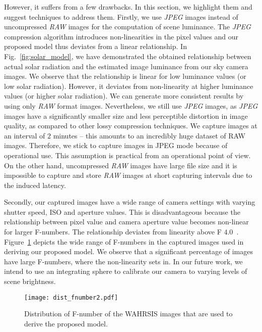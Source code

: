 However, it suffers from a few drawbacks. In this section, we highlight them and suggest techniques to address them. Firstly, we use \emph{JPEG} images instead of uncompressed \emph{RAW} images for the computation of scene luminance. The \emph{JPEG} compression algorithm introduces non-linearities in the pixel values and our proposed model thus deviates from a linear relationship. In Fig.~\ref{fig:solar_model}, we have demonstrated the obtained relationship between actual solar radiation and the estimated image luminance from our sky camera images. We observe that the relationship is linear for low luminance values (or low solar radiation). However, it deviates from non-linearity at higher luminance values (or higher solar radiation). We can generate more consistent results by using only \emph{RAW} format images. Nevertheless, we still use \emph{JPEG} images, as \emph{JPEG} images have a significantly smaller size and less perceptible distortion in image quality, as compared to other lossy compression techniques. We capture images at an interval of $2$ minutes -- this amounts to an incredibly huge dataset of RAW images. Therefore, we stick to capture images in JPEG mode because of operational use. This assumption is practical from an operational point of view. On the other hand, uncompressed \emph{RAW} images have large file size and it is impossible to capture and store \emph{RAW} images at short capturing intervals due to the induced latency. 

Secondly, our captured images have a wide range of camera settings with varying shutter speed, ISO and aperture values. This is disadvantageous because the relationship between pixel value and camera aperture value becomes non-linear for larger F-numbers. The relationship deviates from linearity above F $4.0$~\cite{hiscocks2011measuring}.  Figure~\ref{fig:fn_dist} depicts the wide range of F-numbers in the captured images used in deriving our proposed model. We observe that a significant percentage of images have large F-numbers, where the non-linearity sets in. In our future work, we intend to use an integrating sphere to calibrate our camera to varying levels of scene brightness.

\begin{figure}[htb]
\begin{center}
\texttt{[image: dist\_fnumber2.pdf]}
\caption{Distribution of F-number of the WAHRSIS images that are used to derive the proposed model.
\label{fig:fn_dist}}
\end{center}
\end{figure}

